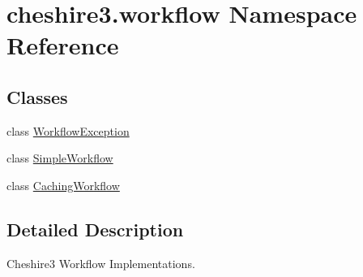 \hypertarget{namespacecheshire3_1_1workflow}{\section{cheshire3.\-workflow Namespace Reference}
\label{namespacecheshire3_1_1workflow}
}
\subsection*{Classes}
\begin{DoxyCompactItemize}
\item 
class \hyperlink{classcheshire3_1_1workflow_1_1_workflow_exception}{Workflow\-Exception}
\item 
class \hyperlink{classcheshire3_1_1workflow_1_1_simple_workflow}{Simple\-Workflow}
\item 
class \hyperlink{classcheshire3_1_1workflow_1_1_caching_workflow}{Caching\-Workflow}
\end{DoxyCompactItemize}


\subsection{Detailed Description}
\begin{DoxyVerb}Cheshire3 Workflow Implementations.\end{DoxyVerb}
 